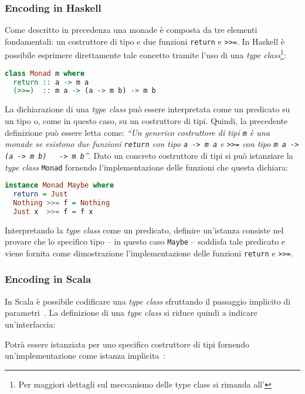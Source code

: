 \subsubsection{Encoding in Haskell}
Come descritto in precedenza una monade è composta da tre elementi fondamentali: un costruttore di tipo e due funzioni \lstinline{return} e \lstinline{>>=}. In Haskell è possibile esprimere direttamente tale concetto tramite l'uso di una \emph{type class}\footnote{Per maggiori dettagli sul meccanismo delle type class si rimanda all'}:
\begin{lstlisting}[language=haskell]
class Monad m where
  return :: a -> m a
  (>>=)  :: m a -> (a -> m b) -> m b
\end{lstlisting}

La dichiarazione di una \emph{type class} può essere interpretata come un predicato su un tipo o, come in questo caso, su un costruttore di tipi.
Quindi, la precedente definizione può essere letta come: \emph{``Un generico costruttore di tipi \lstinline{m} è una monade se esistono due funzioni \lstinline{return} con tipo \lstinline{a -> m a} e \lstinline{>>=} con tipo \lstinline{m a -> (a -> m b)   -> m b}''}.
Dato un concreto costruttore di tipi si può istanziare la \emph{type class} \lstinline{Monad} fornendo l'implementazione delle funzioni che questa dichiara:
\begin{lstlisting}[language=haskell]
instance Monad Maybe where
  return = Just
  Nothing >>= f = Nothing
  Just x  >>= f = f x
\end{lstlisting}

Interpretando la \emph{type class} come un predicato, definire un'istanza consiste nel provare che lo specifico tipo -- in questo caso \lstinline{Maybe} -- soddisfa tale predicato e viene fornita come dimostrazione l'implementazione delle funzioni \lstinline{return} e \lstinline{>>=}.

\subsubsection{Encoding in Scala}
In Scala è possibile codificare una \emph{type class} sfruttando il passaggio implicito di parametri~\cite{cit:type-classes-as-objects-and-implicits}. La definizione di una \emph{type class} si riduce quindi a indicare un'interfaccia:

Potrà essere istanziata per uno specifico costruttore di tipi fornendo un'implementazione come istanza implicita~\cite{cit:scala-book-type-classes}:


